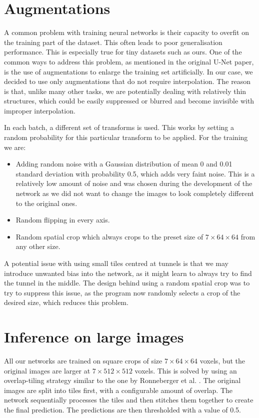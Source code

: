 \documentclass[
  digital,     %
  oneside,     %
  nosansbold,  %
  nocolorbold, %
  lof,         %
  lot,         %
]{fithesis4}
\begin{document}
\section{Augmentations}

A common problem with training neural networks is their capacity to overfit on the training part of the dataset. This often leads to poor generalisation performance. This is especially true for tiny datasets such as ours. One of the common ways to address this problem, as mentioned in the original U-Net paper, is the use of augmentations \parencite{Ronneberger2015} to enlarge the training set artificially. In our case, we decided to use only augmentations that do not require interpolation. The reason is that, unlike many other tasks, we are potentially dealing with relatively thin structures, which could be easily suppressed or blurred and become invisible with improper interpolation.

In each batch, a different set of transforms is used. This works by setting a random probability for this particular transform to be applied. For the training we are:

\begin{itemize}
    \item{Adding random noise with a Gaussian distribution of mean 0 and 0.01 standard deviation with probability 0.5, which adds very faint noise. This is a relatively low amount of noise and was chosen during the development of the network as we did not want to change the images to look completely different to the original ones.}
    \item{Random flipping in every axis.}
    \item{Random spatial crop which always crops to the preset size of $7 \times 64 \times 64$ from any other size.}
\end{itemize}

A potential issue with using small tiles centred at tunnels is that we may introduce unwanted bias into the network, as it might learn to always try to find the tunnel in the middle. The design behind using a random spatial crop was to try to suppress this issue, as the program now randomly selects a crop of the desired size, which reduces this problem.

\section{Inference on large images}
\label{sec:runningthenetwork}

All our networks are trained on square crops of size $7 \times 64 \times 64$ voxels, but the original images are larger at $7 \times 512 \times 512$ voxels. This is solved by using an overlap-tiling strategy similar to the one by Ronneberger et al. \parencite{Ronneberger2015}. The original images are split into tiles first, with a configurable amount of overlap. The network sequentially processes the tiles and then stitches them together to create the final prediction. The predictions are then thresholded with a value of 0.5.
\end{document}
